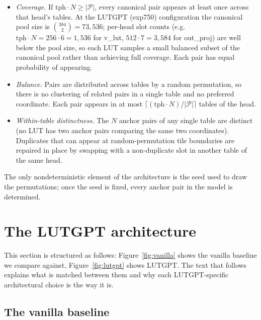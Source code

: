 \documentclass[11pt]{article}
\begin{document}
\begin{itemize}[leftmargin=*,topsep=2pt,itemsep=1pt]
\item \emph{Coverage.} If $\mathrm{tph} \cdot N \geq |\mathcal{P}|$, every canonical pair appears at least once across that head's tables. At the LUTGPT (exp750) configuration the canonical pool size is $\binom{384}{2} = 73{,}536$; per-head slot counts (e.g.\ $\mathrm{tph} \cdot N = 256 \cdot 6 = 1{,}536$ for v\_lut, $512 \cdot 7 = 3{,}584$ for out\_proj) are well below the pool size, so each LUT samples a small balanced subset of the canonical pool rather than achieving full coverage. Each pair has equal probability of appearing.
\item \emph{Balance.} Pairs are distributed across tables by a random permutation, so there is no clustering of related pairs in a single table and no preferred coordinate. Each pair appears in at most $\lceil (\mathrm{tph} \cdot N) / |\mathcal{P}| \rceil$ tables of the head.
\item \emph{Within-table distinctness.} The $N$ anchor pairs of any single table are distinct (no LUT has two anchor pairs comparing the same two coordinates). Duplicates that can appear at random-permutation tile boundaries are repaired in place by swapping with a non-duplicate slot in another table of the same head.
\end{itemize}

The only nondeterministic element of the architecture is the seed used to draw the permutations; once the seed is fixed, every anchor pair in the model is determined.

\section{The LUTGPT architecture}
\label{sec:arch}

This section is structured as follows: Figure~\ref{fig:vanilla} shows the vanilla baseline we compare against, Figure~\ref{fig:lutgpt} shows LUTGPT. The text that follows explains what is matched between them and why each LUTGPT-specific architectural choice is the way it is.

\subsection{The vanilla baseline}
\label{ssec:baseline}
\end{document}
